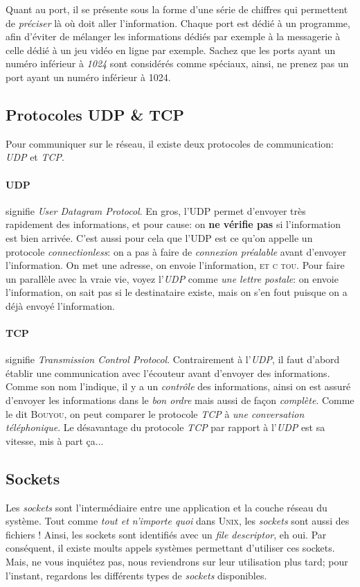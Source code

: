 \documentclass{report}
\begin{document}
Quant au port, il se présente sous la forme d'une série de chiffres qui permettent de \emph{préciser} là où doit aller l'information. Chaque port est dédié à un programme, afin d'éviter de mélanger les informations dédiés par exemple à la messagerie à celle dédié à un jeu vidéo en ligne par exemple. Sachez que les ports ayant un numéro inférieur à \emph{1024} sont considérés comme spéciaux, ainsi, ne prenez pas un port ayant un numéro inférieur à 1024.

\subsection{Protocoles UDP \& TCP}
Pour communiquer sur le réseau, il existe deux protocoles de communication: \emph{UDP} et \emph{TCP}.
\paragraph{UDP}
signifie \emph{User Datagram Protocol}. En gros, l'UDP permet d'envoyer très rapidement des informations, et pour cause: on \textbf{ne vérifie pas} si l'information est bien arrivée. C'est aussi pour cela que l'UDP est ce qu'on appelle un protocole \emph{connectionless}: on a pas à faire de \emph{connexion préalable} avant d'envoyer l'information. On met une adresse, on envoie l'information, \textsc{et c tou}. Pour faire un parallèle avec la vraie vie, voyez l'\emph{UDP} comme \textit{une lettre postale}: on envoie l'information, on sait pas si le destinataire existe, mais on s'en fout puisque on a déjà envoyé l'information.

\paragraph{TCP} signifie \emph{Transmission Control Protocol}. Contrairement à l'\emph{UDP}, il faut d'abord établir une communication avec l'écouteur avant d'envoyer des informations. Comme son nom l'indique, il y a un \emph{contrôle} des informations, ainsi on est assuré d'envoyer les informations dans le \emph{bon ordre} mais aussi de façon \emph{complète}. Comme le dit \textsc{Bouyou}, on peut comparer le protocole \emph{TCP} à \emph{une conversation téléphonique}. Le désavantage du protocole \emph{TCP} par rapport à l'\emph{UDP} est sa vitesse, mis à part ça...


\subsection{Sockets}
Les \emph{sockets} sont l'intermédiaire entre une application et la couche réseau du système. Tout comme \emph{tout et n'importe quoi} dans \textsc{Unix}, les \emph{sockets} sont aussi des fichiers ! Ainsi, les sockets sont identifiés avec un \emph{file descriptor}, eh oui. Par conséquent, il existe moults appels systèmes permettant d'utiliser ces sockets.\\
Mais, ne vous inquiétez pas, nous reviendrons sur leur utilisation plus tard; pour l'instant, regardons les différents types de \emph{sockets} disponibles. 
\end{document}
